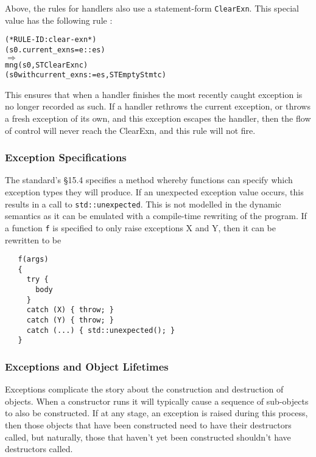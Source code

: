 \documentclass[11pt]{article}
\begin{document}
%
Above, the rules for handlers also use a statement-form
\texttt{ClearExn}.  This special value has the following rule
:
\begin{center}
\begin{minipage}{\textwidth}
\begin{alltt}
(* RULE-ID: clear-exn *)
     (s0.current_exns = e::es)
   \(\Rightarrow\)
     mng (s0, ST ClearExn c)
         (s0 with current_exns := es, ST EmptyStmt c)
\end{alltt}
\end{minipage}
\end{center}
This ensures that when a handler finishes the most recently caught
exception is no longer recorded as such.  If a handler rethrows the
current exception, or throws a fresh exception of its own, and this
exception escapes the handler, then the flow of control will never
reach the \textsf{ClearExn}, and this rule will not fire.

\subsubsection{Exception Specifications}

The standard's \S15.4 specifies a method whereby functions can specify
which exception types they will produce.  If an unexpected exception
value occurs, this results in a call to \texttt{std::unexpected}.
This is not modelled in the dynamic semantics as it can be emulated
with a compile-time rewriting of the program.  If a function
\texttt{f} is specified to only raise exceptions X and Y, then it can
be rewritten to be
\begin{center}
\begin{minipage}{\textwidth}
\begin{verbatim}
   f(args)
   {
     try {
       body
     }
     catch (X) { throw; }
     catch (Y) { throw; }
     catch (...) { std::unexpected(); }
   }
\end{verbatim}
\end{minipage}
\end{center}

\subsubsection{Exceptions and Object Lifetimes}

Exceptions complicate the story about the construction and destruction
of objects.  When a constructor runs it will typically cause a
sequence of sub-objects to also be constructed. If at any stage, an
exception is raised during this process, then those objects that have
been constructed need to have their destructors called, but naturally,
those that haven't yet been constructed shouldn't have destructors
called.
\end{document}
